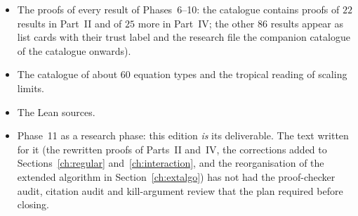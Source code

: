 \begin{itemize}
\item The proofs of every result of Phases~6--10: the catalogue contains proofs of $22$ results in Part~II and of $25$ more in Part~IV; the other $86$ results appear as list cards with their trust label and the research file the companion catalogue of the catalogue onwards).
\item The catalogue of about $60$ equation types and the tropical reading of scaling limits.
\item The Lean sources.
\item Phase~11 as a research phase: this edition \emph{is} its deliverable. The text written for it (the rewritten proofs of Parts~II and~IV, the corrections added to Sections~\ref{ch:regular} and~\ref{ch:interaction}, and the reorganisation of the extended algorithm in Section~\ref{ch:extalgo}) has not had the proof-checker audit, citation audit and kill-argument review that the plan required before closing.
\end{itemize}
